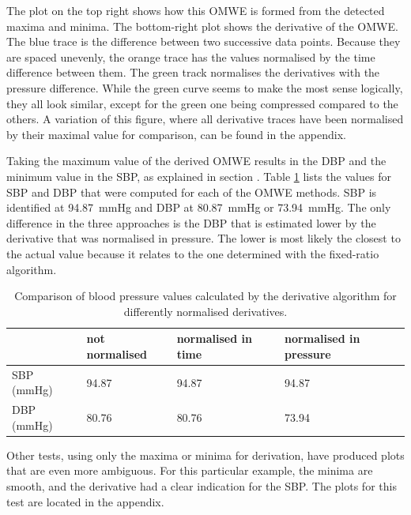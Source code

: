 The plot on the top right shows how this OMWE is formed from the detected maxima and minima. The bottom-right plot shows the derivative of the OMWE. The blue trace is the difference between two successive data points. Because they are spaced unevenly, the orange trace has the values normalised by the time difference between them. The green track normalises the derivatives with the pressure difference. While the green curve seems to make the most sense logically, they all look similar, except for the green one being compressed compared to the others. A variation of this figure, where all derivative traces have been normalised by their maximal value for comparison, can be found in the appendix.

Taking the maximum value of the derived OMWE results in the DBP and the minimum value in the SBP, as explained in section .
Table \ref{tbl:pyDer} lists the values for SBP and DBP that were computed for each of the OMWE methods. SBP is identified at \SI{94.87}{\mmHg} and DBP at \SI{80.87}{\mmHg} or \SI{73.94}{\mmHg}. The only difference in the three approaches is the DBP that is estimated lower by the derivative that was normalised in pressure. The lower is most likely the closest to the actual value because it relates to the one determined with the fixed-ratio algorithm.

\begin{table}[t]\label{tbl:pyDer}
\centering
\begin{tabular}{llll}
\hline
           & not normalised & normalised in time & normalised in pressure \\ \hline
SBP (mmHg) & 94.87          & 94.87              & 94.87                  \\ \hline
DBP (mmHg) & 80.76          & 80.76              & 73.94                  \\ \hline
\end{tabular}
\caption{Comparison of blood pressure values calculated by the derivative algorithm for differently normalised derivatives.}
\end{table}


Other tests, using only the maxima or minima for derivation, have produced plots that are even more ambiguous. For this particular example, the minima are smooth, and the derivative had a clear indication for the SBP. The plots for this test are located in the appendix.

